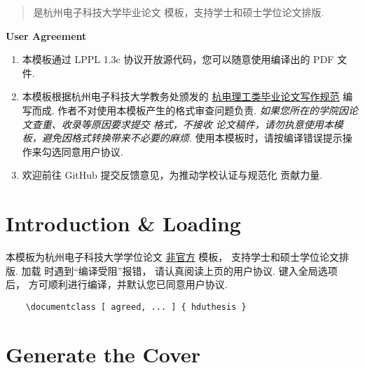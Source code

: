 \documentclass[11pt]{hduthesisdoc}
\begin{document}
\maketitle

\begin{abstract}
   是杭州电子科技大学毕业论文 模板，支持学士和硕士学位论文排版.
\end{abstract}
\begin{center}
  \small\bfseries User Agreement
\end{center}
\begin{enumerate}
  \item 本模板通过 LPPL 1.3c 协议开放源代码，您可以随意使用编译出的 PDF 文件.
  \item 本模板根据杭州电子科技大学教务处颁发的 \href{https://jwc.hdu.edu.cn/2022/0428/c4528a153813/page.htm}{杭电理工类毕业论文写作规范} 编写而成. 作者不对使用本模板产生的格式审查问题负责. \emph{如果您所在的学院因论文查重、收录等原因要求提交  格式，不接收  论文稿件，请勿执意使用本模板，避免因格式转换带来不必要的麻烦.} 使用本模板时，请按编译错误提示操作来勾选同意用户协议.
  \item 欢迎前往 GitHub 提交反馈意见，为推动学校认证与规范化  贡献力量.
\end{enumerate}
\thispagestyle{empty}
\endtitlepage
\restoregeometry

\section{Introduction \& Loading }

本模板为杭州电子科技大学学位论文 \underline{非官方}  模板，
支持学士和硕士学位论文排版. 加载  时遇到``编译受阻''报错，
请认真阅读上页的用户协议. 键入全局选项  后，
方可顺利进行编译，并默认您已同意用户协议.

\begin{framed}
  \begin{verbatim}
    \documentclass [ agreed, ... ] { hduthesis }
  \end{verbatim}
\end{framed}

\section{Generate the Cover}
\end{document}
